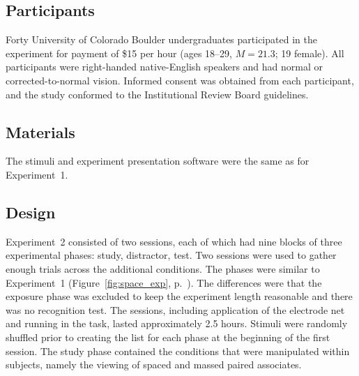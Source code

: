 \subsection{Participants}


Forty University of Colorado Boulder undergraduates participated in the experiment for payment of \$15 per hour (ages 18--29, $M=21.3$; 19 female).  All participants were right-handed native-English speakers and had normal or corrected-to-normal vision.  Informed consent was obtained from each participant, and the study conformed to the Institutional Review Board guidelines.

\subsection{Materials}

The stimuli and experiment presentation software were the same as for Experiment~1.

\subsection{Design}


Experiment~2 consisted of two sessions, each of which had nine blocks of three experimental phases: study, distractor, test.
Two sessions were used to gather enough trials across the additional conditions.
The phases were similar to Experiment~1 (Figure~\ref{fig:space_exp}, p.~\pageref{fig:space_exp}).  The differences were that the exposure phase was excluded to keep the experiment length reasonable and there was no recognition test.
The sessions, including application of the electrode net and running in the task, lasted approximately 2.5 hours.  Stimuli were randomly shuffled prior to creating the list for each phase at the beginning of the first session.  The study phase contained the conditions that were manipulated within subjects, namely the viewing of spaced and massed paired associates.

